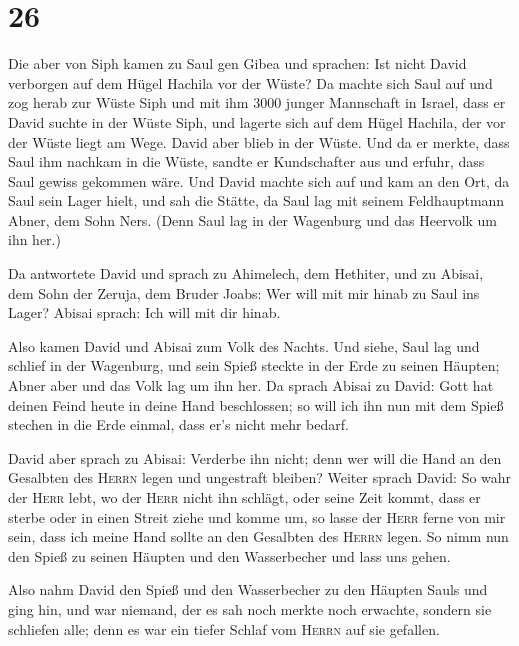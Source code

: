 \hypertarget{section-25}{%
\section{26}\label{section-25}}

 Die aber von Siph kamen zu Saul gen Gibea und sprachen:
Ist nicht David verborgen auf dem Hügel Hachila vor der Wüste?
 Da machte sich Saul auf und zog herab zur Wüste Siph und
mit ihm 3000 junger Mannschaft in Israel, dass er David suchte in der
Wüste Siph,  und lagerte sich auf dem Hügel Hachila, der
vor der Wüste liegt am Wege. David aber blieb in der Wüste. Und da er
merkte, dass Saul ihm nachkam in die Wüste,  sandte er
Kundschafter aus und erfuhr, dass Saul gewiss gekommen wäre.
 Und David machte sich auf und kam an den Ort, da Saul
sein Lager hielt, und sah die Stätte, da Saul lag mit seinem
Feldhauptmann Abner, dem Sohn Ners. (Denn Saul lag in der Wagenburg und
das Heervolk um ihn her.)

 Da antwortete David und sprach zu Ahimelech, dem
Hethiter, und zu Abisai, dem Sohn der Zeruja, dem Bruder Joabs: Wer will
mit mir hinab zu Saul ins Lager? Abisai sprach: Ich will mit dir hinab.

 Also kamen David und Abisai zum Volk des Nachts. Und
siehe, Saul lag und schlief in der Wagenburg, und sein Spieß steckte in
der Erde zu seinen Häupten; Abner aber und das Volk lag um ihn her.
 Da sprach Abisai zu David: Gott hat deinen Feind heute in
deine Hand beschlossen; so will ich ihn nun mit dem Spieß stechen in die
Erde einmal, dass er's nicht mehr bedarf.

 David aber sprach zu Abisai: Verderbe ihn nicht; denn wer
will die Hand an den Gesalbten des \textsc{Herrn} legen und ungestraft
bleiben?  Weiter sprach David: So wahr der \textsc{Herr}
lebt, wo der \textsc{Herr} nicht ihn schlägt, oder seine Zeit kommt,
dass er sterbe oder in einen Streit ziehe und komme um, 
so lasse der \textsc{Herr} ferne von mir sein, dass ich meine Hand
sollte an den Gesalbten des \textsc{Herrn} legen. So nimm nun den Spieß
zu seinen Häupten und den Wasserbecher und lass uns gehen.

 Also nahm David den Spieß und den Wasserbecher zu den
Häupten Sauls und ging hin, und war niemand, der es sah noch merkte noch
erwachte, sondern sie schliefen alle; denn es war ein tiefer Schlaf vom
\textsc{Herrn} auf sie gefallen.

